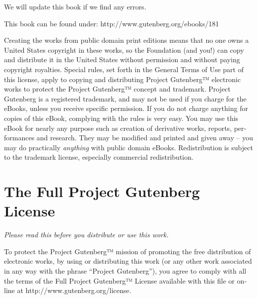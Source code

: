 \documentclass[a5paper]{book}
\begin{document}
\begin{german}
\begin{english}
\begin{pgfooter_env}
We will update this book if we find any errors.\par

This book can be found under: {http://www.gutenberg.org/ebooks/181}\par

Creating the works from public domain print editions means that no one
owns a United States copyright in these works, so the Foundation (and
you!) can copy and distribute it in the United States without
permission and without paying copyright royalties.  Special rules, set
forth in the General Terms of Use part of this license, apply to
copying and distributing Project Gutenberg™ electronic works to
protect the Project Gutenberg™ concept and trademark. Project
Gutenberg is a registered trademark, and may not be used if you charge
for the eBooks, unless you receive specific permission. If you do not
charge anything for copies of this eBook, complying with the rules is
very easy. You may use this eBook for nearly any purpose such as
creation of derivative works, reports, performances and research.
They may be modified and printed and given away – you may do
practically {\itshape{anything}} with public domain eBooks.  Redistribution is
subject to the trademark license, especially commercial
redistribution.\par{}

%
\label{the-full-project-gutenberg-license}%
\hypertarget{the-full-project-gutenberg-license}{}%
\label{project-gutenberg-license}%
\hypertarget{project-gutenberg-license}{}%
%
\section*{The Full Project Gutenberg License}


{\itshape{Please read this before you distribute or use this work.}}\par

To protect the Project Gutenberg™ mission of promoting the free
distribution of electronic works, by using or distributing this work
(or any other work associated in any way with the phrase “Project
Gutenberg”), you agree to comply with all the terms of the Full
Project Gutenberg™ License available with this file or online at
{http://www.gutenberg.org/license}.\par

%
\label{section-1-general-terms-of-use-redistributing-project-gutenberg-electronic-works}%
\hypertarget{section-1-general-terms-of-use-redistributing-project-gutenberg-electronic-works}{}%
%

\end{pgfooter_env}
\end{english}
\end{german}
\end{document}
